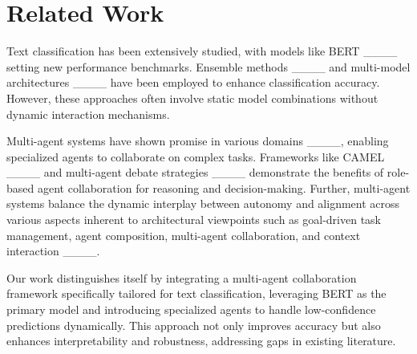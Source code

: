 \section{Related Work}
\label{sec:related_work}

Text classification has been extensively studied, with models like BERT ____ setting new performance benchmarks. Ensemble methods ____ and multi-model architectures ____ have been employed to enhance classification accuracy. However, these approaches often involve static model combinations without dynamic interaction mechanisms.

Multi-agent systems have shown promise in various domains ____, enabling specialized agents to collaborate on complex tasks. Frameworks like CAMEL ____ and multi-agent debate strategies ____ demonstrate the benefits of role-based agent collaboration for reasoning and decision-making. Further, multi-agent systems balance the dynamic interplay between autonomy and alignment across various aspects inherent to architectural viewpoints such as goal-driven task management, agent composition, multi-agent collaboration, and context interaction ____. 

Our work distinguishes itself by integrating a multi-agent collaboration framework specifically tailored for text classification, leveraging BERT as the primary model and introducing specialized agents to handle low-confidence predictions dynamically. This approach not only improves accuracy but also enhances interpretability and robustness, addressing gaps in existing literature.